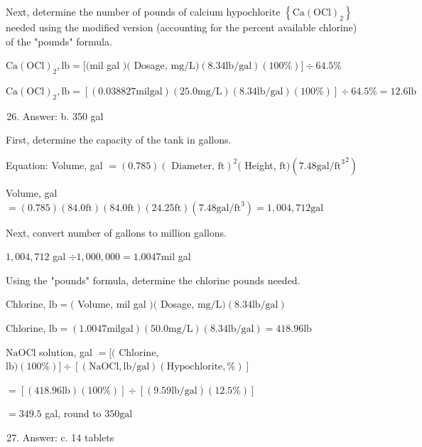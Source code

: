 \documentclass[10pt]{article}
\begin{document}
Next, determine the number of pounds of calcium hypochlorite $\left\{\mathrm{Ca}(\mathrm{OCl})_{2}\right\}$ needed using the modified version (accounting for the percent available chlorine) of the "pounds" formula.

$\mathrm{Ca}(\mathrm{OCl})_{2}, \mathrm{lb}=[(\mathrm{mil}$ gal $)($ Dosage, $\mathrm{mg} / \mathrm{L})(8.34 \mathrm{lb} / \mathrm{gal})(100 \%)] \div 64.5 \%$

$\mathrm{Ca}(\mathrm{OCl})_{2}, \mathrm{lb}=[(0.038827 \mathrm{mil} \mathrm{gal})(25.0 \mathrm{mg} / \mathrm{L})(8.34 \mathrm{lb} / \mathrm{gal})(100 \%)] \div 64.5 \%=12.6 \mathrm{lb}$

\begin{enumerate}
  \setcounter{enumi}{25}
  \item Answer: b. 350 gal
\end{enumerate}

First, determine the capacity of the tank in gallons.

Equation: Volume, gal $=(0.785)(\text { Diameter, } \mathrm{ft})^{2}($ Height, $\mathrm{ft})\left(7.48{\mathrm{gal} / \mathrm{ft}^{3}}^{2}\right)$

Volume, gal $=(0.785)(84.0 \mathrm{ft})(84.0 \mathrm{ft})(24.25 \mathrm{ft})\left(7.48 \mathrm{gal} / \mathrm{ft}^{3}\right)=1,004,712 \mathrm{gal}$

Next, convert number of gallons to million gallons.

$1,004,712$ gal $\div 1,000,000=1.0047 \mathrm{mil}$ gal

Using the "pounds" formula, determine the chlorine pounds needed.

Chlorine, $\mathrm{lb}=($ Volume, mil gal $)($ Dosage, $\mathrm{mg} / \mathrm{L})(8.34 \mathrm{lb} / \mathrm{gal})$

Chlorine, $\mathrm{lb}=(1.0047 \mathrm{mil} \mathrm{gal})(50.0 \mathrm{mg} / \mathrm{L})(8.34 \mathrm{lb} / \mathrm{gal})=418.96 \mathrm{lb}$

$\mathrm{NaOCl}$ solution, gal $=[($ Chlorine, $\mathrm{lb})(100 \%)] \div[(\mathrm{NaOCl}, \mathrm{lb} / \mathrm{gal})(\mathrm{Hypochlorite}, \%)]$

$=[(418.96 \mathrm{lb})(100 \%)] \div[(9.59 \mathrm{lb} / \mathrm{gal})(12.5 \%)]$

$=349.5$ gal, round to $350 \mathrm{gal}$

\begin{enumerate}
  \setcounter{enumi}{26}
  \item Answer: c. 14 tablets
\end{enumerate}
\end{document}
